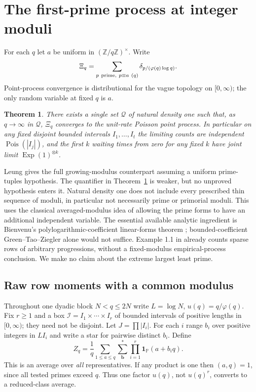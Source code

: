 \documentclass[11pt]{article}
\newtheorem{theorem}{Theorem}
\newcommand{\1}{\mathbf{1}}
\newcommand{\ph}{\varphi}
\begin{document}
\section{The first-prime process at integer moduli}

For each $q$ let $a$ be uniform in $(\mathbb Z/q\mathbb Z)^\times$. Write
\[
 \Xi_q=\sum_{p\ {\rm prime},\ p\equiv a\ (q)}\delta_{p/(\ph(q)\log q)}.
\]
Point-process convergence is distributional for the vague topology on $[0,\infty)$; the only random variable at fixed $q$ is $a$.
\begin{theorem}\label{thm:integer}
There exists a single set $\mathcal Q$ of natural density one such that, as $q\to\infty$ in $\mathcal Q$, $\Xi_q$ converges to the unit-rate Poisson point process. In particular on any fixed disjoint bounded intervals $I_1,\ldots,I_t$ the limiting counts are independent $\operatorname{Pois}(|I_j|)$, and the first $k$ waiting times from zero for any fixed $k$ have joint limit $\operatorname{Exp}(1)^{\otimes k}$.
\end{theorem}
Leung \cite{lecounts,lepp} gives the full growing-modulus counterpart assuming a uniform prime-tuples hypothesis. The quantifier in Theorem~\ref{thm:integer} is weaker, but no unproved hypothesis enters it. Natural density one does not include every prescribed thin sequence of moduli, in particular not necessarily prime or primorial moduli. This uses the classical averaged-modulus idea of allowing the prime forms to have an additional independent variable. The essential available analytic ingredient is Bienvenu's polylogarithmic-coefficient linear-forms theorem \cite{bien}; bounded-coefficient Green--Tao--Ziegler alone would not suffice. Example 1.1 in \cite{bien} already counts sparse rows of arbitrary progressions, without a fixed-modulus empirical-process conclusion. We make no claim about the extreme largest least prime.

\subsection{Raw row moments with a common modulus}
Throughout one dyadic block $N<q\le2N$ write $L=\log N$, $u(q)=q/\ph(q)$. Fix $r\ge1$ and a box $\mathcal I=I_1\times\cdots\times I_r$ of bounded intervals of positive lengths in $[0,\infty)$; they need not be disjoint. Let $J=\prod |I_i|$. For each $i$ range $b_i$ over positive integers in $L I_i$ and write a star for pairwise distinct $b_i$. Define
\[
 Z_q=\frac1q\sum_{1\le a\le q}\sum_{\mathbf b}^{*}
     \prod_{i=1}^r\1_{\mathbb P}(a+b_i q).
\]
This is an average over \emph{all} representatives. If any product is one then $(a,q)=1$, since all tested primes exceed $q$. Thus one factor $u(q)$, not $u(q)^r$, converts to a reduced-class average.
\end{document}
